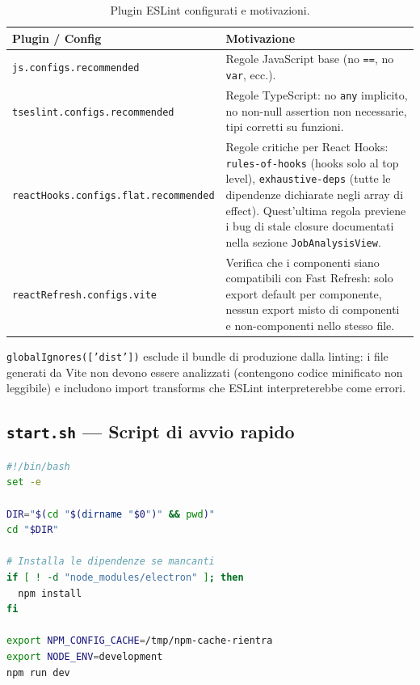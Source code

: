 \documentclass[a4paper,12pt]{article}
\begin{document}
\begin{table}[H]
\centering\small
\caption{Plugin ESLint configurati e motivazioni.}
\begin{tabular}{L{5.5cm} L{7cm}}
\toprule
\textbf{Plugin / Config} & \textbf{Motivazione} \\
\midrule
\texttt{js.configs.recommended} &
  Regole JavaScript base (no \texttt{==}, no \texttt{var}, ecc.). \\[3pt]
\texttt{tseslint.configs.recommended} &
  Regole TypeScript: no \texttt{any} implicito, no non-null assertion
  non necessarie, tipi corretti su funzioni. \\[3pt]
{\small\texttt{reactHooks.\allowbreak{}configs.flat.\allowbreak{}recommended}} &
  Regole critiche per React Hooks: \texttt{rules-of-hooks} (hooks
  solo al top level), \texttt{exhaustive-deps} (tutte le dipendenze
  dichiarate negli array di effect). Quest'ultima regola previene
  i bug di stale closure documentati nella sezione
  \texttt{JobAnalysisView}. \\[3pt]
\texttt{reactRefresh.configs.vite} &
  Verifica che i componenti siano compatibili con Fast Refresh:
  solo export default per componente, nessun export misto di
  componenti e non-componenti nello stesso file. \\
\bottomrule
\end{tabular}
\end{table}

\texttt{globalIgnores(['dist'])} esclude il bundle di produzione
dalla linting: i file generati da Vite non devono essere analizzati
(contengono codice minificato non leggibile) e includono import
transforms che ESLint interpreterebbe come errori.

\subsection{\texttt{start.sh} --- Script di avvio rapido}

\begin{lstlisting}[language=bash, caption={\texttt{start.sh} --- contenuto completo.}]
#!/bin/bash
set -e

DIR="$(cd "$(dirname "$0")" && pwd)"
cd "$DIR"

# Installa le dipendenze se mancanti
if [ ! -d "node_modules/electron" ]; then
  npm install
fi

export NPM_CONFIG_CACHE=/tmp/npm-cache-rientra
export NODE_ENV=development
npm run dev
\end{lstlisting}
\end{document}

